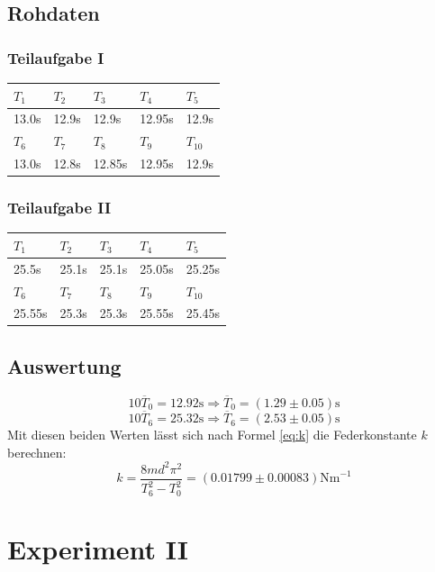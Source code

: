 \documentclass[12pt,a4paper]{article}
\begin{document}
\subsection*{Rohdaten}
\subsubsection*{Teilaufgabe I}
\begin{tabular}{|l|l|l|l|l|}
\hline
$T_{1}$&$T_{2}$&$T_{3}$&$T_{4}$&$T_{5}$\\
\hline
13.0s&12.9s&12.9s&12.95s&12.9s\\
\hline
\hline
$T_{6}$&$T_{7}$&$T_{8}$&$T_{9}$&$T_{10}$\\
\hline
13.0s&12.8s&12.85s&12.95s&12.9s\\
\hline
\end{tabular}

\subsubsection*{Teilaufgabe II}
\begin{tabular}{|l|l|l|l|l|}
\hline
$T_{1}$&$T_{2}$&$T_{3}$&$T_{4}$&$T_{5}$\\
\hline
25.5s&25.1s&25.1s&25.05s&25.25s\\
\hline
\hline
$T_{6}$&$T_{7}$&$T_{8}$&$T_{9}$&$T_{10}$\\
\hline
25.55s&25.3s&25.3s&25.55s&25.45s\\
\hline
\end{tabular}

\subsection*{Auswertung}
\[ 10\overline{T}_0 = 12.92\mbox{s} \Rightarrow \overline{T}_0 = (1.29 \pm 0.05) \mbox{s} \]
\[ 10\overline{T}_6 = 25.32\mbox{s} \Rightarrow \overline{T}_6 = (2.53 \pm 0.05) \mbox{s} \]
Mit diesen beiden Werten l\"asst sich nach Formel \ref{eq:k} die Federkonstante $k$ berechnen:
\[ k = \frac{8md^2\pi^2}{T_6^2 - T_0^2} = (0.01799 \pm 0.00083) \mbox{Nm}^{-1} \]

\section*{Experiment II}
\end{document}
